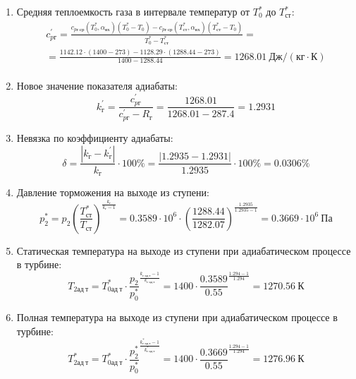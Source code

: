 \documentclass[a4paper,10pt]{article}
\begin{document}
\begin{enumerate}
        \item Средняя теплоемкость газа в интервале температур от $T_0^*$ до $T_{ст}^*$:
        \begin{gather*}
            c_{pг}^\prime = \frac{
		        c_{pг\ ср} (T_0^*, \alpha_{вх}) (T_0^* - T_0) - c_{pг\ ср} (T_{ст}^*, \alpha_{вх})(T_{ст}^* - T_0)
		    }{
		        T_0^* - T_{ст}^*} =\\
            =\frac{
		        1142.12 \cdot
                (1400 - 273) -
		        1128.29 \cdot
                (1288.44 - 273)
		    }{
		        1400 - 1288.44} =
		    1268.01 \ Дж / (кг \cdot К)\\
        \end{gather*}

        \item Новое значение показателя адиабаты:
        \[
            k_г^\prime = \frac{c_{pг}^\prime}{c_{pг}^\prime - R_г} =
                \frac{
                    1268.01
                }{
                    1268.01 - 287.4
                }
            = 1.2931
        \]

        \item Невязка по коэффициенту адиабаты:
        \[
            \delta = \frac{ \left| k_г - k_г^\prime \right| }{ k_г } \cdot 100 \%=
                \frac{
                    \left| 1.2935 - 1.2931 \right|
                }{
                    1.2935
                } \cdot 100 \% =
            0.0306 \%
        \]

        \item Давление торможения на выходе из ступени:
        \[
            p_2^* = p_2 \left(
                            \frac{ T_{ст}^* }{ T_{ст} }
                    \right) ^ \frac{ k_г }{ k_г - 1 } =
                 0.3589 \cdot 10^6 \cdot \left(
                            \frac{ 1288.44 }{ 1282.07 }
                    \right) ^
                \frac{ 1.2935 }{ 1.2935 - 1 } =
            0.3669 \cdot 10^6 \ Па
        \]

        \item Статическая температура на выходе из ступени при адиабатическом процессе в турбине:
        \[
            T_{2ад\ т} = T_{0ад\ т}^* \cdot \frac{p_2}{p_0^*} ^ {
                    \frac{k_{г\ ад\ т} - 1}{k_{г\ ад\ т} }
            } = 1400 \cdot
            \frac{ 0.3589
            }{
            0.55
            } ^ {
                    \frac{1.294 - 1}{1.294}
            } =
            1270.56\ К
        \]

        \item Полная температура на выходе из ступени при адиабатическом процессе в турбине:
        \[
            T_{2ад\ т}^* = T_{0ад\ т}^* \cdot \frac{p_2^*}{p_0^*} ^ {
                    \frac{k_{г\ ад\ т}^* - 1}{k_{г\ ад\ т}^*}
            } = 1400 \cdot
            \frac{ 0.3669
            }{
            0.55
            } ^ {
                    \frac{1.294 - 1}{1.294}
            } =
            1276.96\ К
        \]


\end{enumerate}
\end{document}
